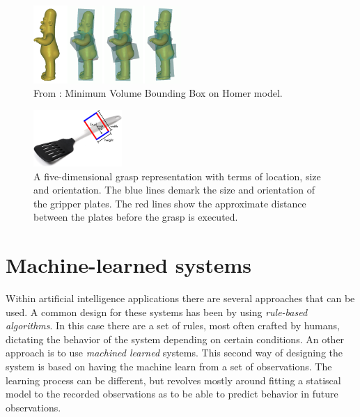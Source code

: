 \begin{figure}
	\centering
	\includegraphics[width=0.5\textwidth]{img/related-work/mvbb.png}
	\caption{From \parencite{Huebner2008}: Minimum Volume Bounding Box on Homer model.}
	\label{fig:rel__mvbb}
\end{figure}

\begin{figure}
	\centering
	\includegraphics[width=0.3\textwidth]{img/related-work/grasp-representation.png}
	\caption{A five-dimensional grasp representation with terms of location, size and orientation. The blue lines demark the size and orientation of the gripper plates. The red lines show the approximate distance between the plates before the grasp is executed.}
	\label{fig:grasp-representation}
\end{figure}


\section{Machine-learned systems}
\label{sec:machine_learned_systems}
Within artificial intelligence applications there are several approaches that can be used. A common design for these systems has been by using \emph{rule-based algorithms}. In this case there are a set of rules, most often crafted by humans, dictating the behavior of the system depending on certain conditions. An other approach is to use \emph{machined learned} systems. This second way of designing the system is based on having the machine learn from a set of observations. The learning process can be different, but revolves mostly around fitting a statiscal model to the recorded observations as to be able to predict behavior in future observations.

